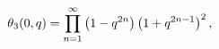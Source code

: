 \[\mathop{\theta_{3}\/}\nolimits\!\left(0,q\right)=\prod\limits_{n=1}^{\infty}%
\left(1-q^{2n}\right)\left(1+q^{2n-1}\right)^{2},\]